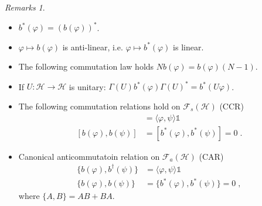 \documentclass[
a4paper, %
11pt, %
onecolumn, %
openany, %
]{memoir}
\theoremstyle{definition}
\theoremstyle{remark}
\newtheorem{remarks}{Remarks}[chapter]
\theoremstyle{plain}
\begin{document}
\begin{remarks}
	\begin{itemize}
		\item $b^*(\varphi)=(b(\varphi))^*$.
		\item $\varphi\mapsto b(\varphi)$ is anti-linear, i.e. $\varphi\mapsto b^*(\varphi)$ is linear.
		\item The following commutation law holds $Nb(\varphi)=b(\varphi)(N-1)$. 
		\item If $U:\mathcal{H}\rightarrow\mathcal{H}$ is unitary: $\Gamma(U)b^*(\varphi)\Gamma(U)^*=b^*(U\varphi)$.
		\item The following commutation relations hold on $\mathcal{F}_s(\mathcal{H})$ (CCR) \begin{align}
		[b(\varphi),b^*(\psi)]&=\langle\varphi,\psi\rangle\mathds{1}\\
		[b(\varphi),b(\psi)]&=[b^*(\varphi),b^*(\psi)]=0\; .
		\end{align}
		\item Canonical anticommutatoin relation on $\mathcal{F}_a(\mathcal{H})$ (CAR)\begin{align}
		\{b(\varphi),b^{\dagger}(\psi)\}&=\langle\varphi,\psi\rangle \mathds{1}\\
		\{b(\varphi),b(\psi)\}&=\{b^*(\varphi),b^*(\psi)\}=0\; ,
		\end{align}
		where $\{A,B\}=AB+BA$.
	\end{itemize}
\end{remarks}
\end{document}
